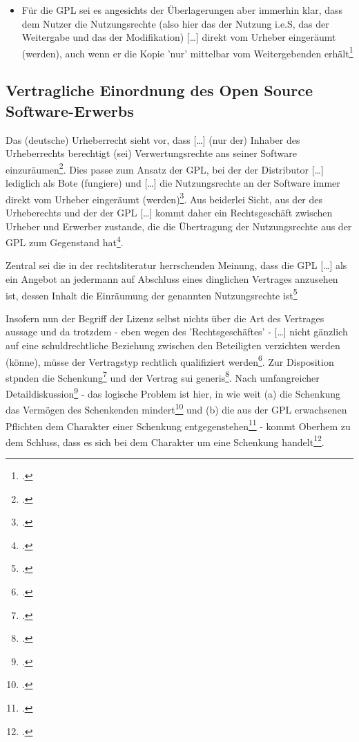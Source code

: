 \documentclass[DIV=calc,BCOR=5mm,11pt,headings=small,oneside,abstract=true, toc=bib]{scrartcl}
\begin{document}
\begin{itemize}
  \glqq{}Miturheberschaft\grqq{} nicht der Umfang, sondern die Qualität des
  Beitrages anzusetzen sei\footcite[vgl.][79 und 83f]{Oberhem2008a}. Und daneben
  stünden wiederum der \glqq{}Nutzer\grqq{}\footcite[vgl.][85]{Oberhem2008a} und
  verschiedene Arten der Distributoren\footcite[vgl.][85ff]{Oberhem2008a}.
  \item Für die GPL sei es angesichts der Überlagerungen aber immerhin klar,
  dass dem Nutzer die Nutzungsrechte (also hier das der Nutzung i.e.S, das der
  Weitergabe und das der Modifikation) \glqq{}[\ldots] direkt vom Urheber
  eingeräumt (werden)\grqq{}, auch wenn er die Kopie 'nur' mittelbar vom
  \glqq{}Weitergebenden\grqq{} erhält\footcite[vgl.][90]{Oberhem2008a}
\end{itemize}

\subsection{\glqq{}Vertragliche Einordnung des Open Source
Software-Erwerbs\grqq{}}

Das (deutsche) Urheberrecht sieht vor, dass \glqq{}[\ldots] (nur der)
Inhaber des Urheberrechts berechtigt (sei) Verwertungsrechte ans seiner
Software einzuräumen\grqq{}\footcite[vgl.][103]{Oberhem2008a}. Dies passe zum
Ansatz der GPL, bei der der Distributor \glqq{}[\ldots] lediglich als Bote
(fungiere)\grqq{} und \glqq{}[\ldots] die Nutzungsrechte an der Software
immer direkt vom Urheber eingeräumt
(werden)\grqq{}\footcite[vgl.][104]{Oberhem2008a}. Aus beiderlei Sicht, aus der
des Urheberechts und der der GPL \glqq{}[\ldots] kommt daher ein
Rechtsgeschäft zwischen Urheber und Erwerber zustande, die die
Übertragung der Nutzungsrechte aus der GPL zum Gegenstand
hat\grqq{}\footcite[vgl.][104]{Oberhem2008a}.

Zentral sei die in der rechtsliteratur herrschenden Meinung, dass die GPL
\glqq{}[\ldots] als ein Angebot an jedermann auf Abschluss eines
dinglichen Vertrages anzusehen ist, dessen Inhalt die Einräumung der
genannten Nutzungsrechte ist\grqq{}\footcite[vgl.][104]{Oberhem2008a}

Insofern nun der Begriff der Lizenz selbst nichts über die Art des Vertrages
aussage und da trotzdem - eben wegen des 'Rechtsgeschäftes' - \glqq{}[\ldots]
nicht gänzlich auf eine schuldrechtliche Beziehung zwischen den Beteiligten
verzichten werden (könne)\grqq{}, müsse der Vertragstyp \glqq{}rechtlich
qualifiziert werden\grqq{}\footcite[vgl.][105]{Oberhem2008a}. Zur Disposition
stpnden die \glqq{}Schenkung\grqq{}\footcite[vgl.][106ff]{Oberhem2008a} und der
\glqq{}Vertrag sui generis\grqq{}\footcite[vgl.][109]{Oberhem2008a}. Nach
umfangreicher Detaildiskussion\footcite[vgl.][112ff]{Oberhem2008a} - das
logische Problem ist hier, in wie weit (a) die Schenkung das Vermögen des
Schenkenden mindert\footcite[vgl.][118ff]{Oberhem2008a} und (b) die aus
der GPL erwachsenen Pflichten dem Charakter einer Schenkung
entgegenstehen\footcite[vgl.][122ff]{Oberhem2008a} - kommt Oberhem zu dem
Schluss, dass es sich bei dem Charakter um eine Schenkung
handelt\footcite[vgl.][128]{Oberhem2008a}.
\end{document}
